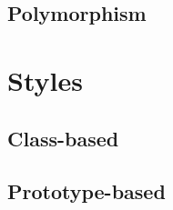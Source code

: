 \documentclass[12pt]{book}
\begin{document}
\subsection{Polymorphism}

\section{Styles}

\subsection{Class-based}

\subsection{Prototype-based}

\ifx\wholebook\relax\else
% 
% 
	
\end{document}
